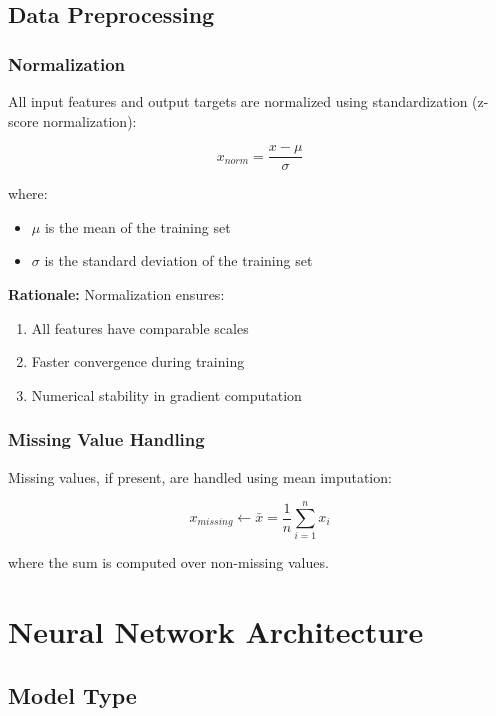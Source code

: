 \documentclass[12pt,a4paper]{article}
\begin{document}
\subsection{Data Preprocessing}

\subsubsection{Normalization}

All input features and output targets are normalized using standardization (z-score normalization):

\begin{equation}
    x_{norm} = \frac{x - \mu}{\sigma}
\end{equation}

where:
\begin{itemize}
    \item $\mu$ is the mean of the training set
    \item $\sigma$ is the standard deviation of the training set
\end{itemize}

\textbf{Rationale:} Normalization ensures:
\begin{enumerate}
    \item All features have comparable scales
    \item Faster convergence during training
    \item Numerical stability in gradient computation
\end{enumerate}

\subsubsection{Missing Value Handling}

Missing values, if present, are handled using mean imputation:

\begin{equation}
    x_{missing} \leftarrow \bar{x} = \frac{1}{n}\sum_{i=1}^{n} x_i
\end{equation}

where the sum is computed over non-missing values.

\section{Neural Network Architecture}

\subsection{Model Type}
\end{document}
